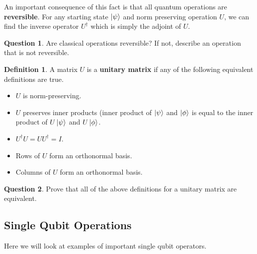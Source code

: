 \documentclass[letterpaper, 12pt]{article}
\newcommand{\1}{\mathds{1}}	%
\theoremstyle{definition}
\newtheorem{definition}[theorem]{Definition}
\newtheorem{question}{Question}
\begin{document}
An important consequence of this fact is that all quantum operations are \textbf{reversible}. For any starting state $\ket{\psi}$ and norm preserving operation $U$, we can find the inverse operator $U^\dagger$ which is simply the adjoint of $U$.

\begin{question}
    Are classical operations reversible? If not, describe an operation that is not reversible.
\end{question}
\vspace{20mm}

\begin{definition}
    A matrix $U$ is a \textbf{unitary matrix} if any of the following equivalent definitions are true.
    \begin{itemize}
        \item $U$ is norm-preserving. 
        \item $U$ preserves inner products (inner product of $\ket{\psi}$ and $\ket{\phi}$ is equal to the inner product of $U\ket{\psi}$ and $U\ket{\phi}$.
        \item $U^\dagger U = U U^\dagger = I$.
        \item Rows of $U$ form an orthonormal basis. 
        \item Columns of $U$ form an orthonormal basis. 
    \end{itemize}
\end{definition}

\begin{question}
    Prove that all of the above definitions for a unitary matrix are equivalent. 
\end{question}
\vspace{55mm}

\subsection{Single Qubit Operations}

Here we will look at examples of important single qubit operators. 
\end{document}
